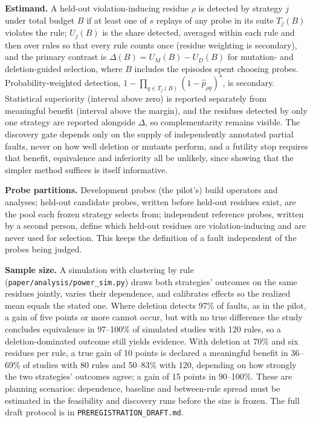 \documentclass[10pt]{article}
\theoremstyle{definition}
\begin{document}
\textbf{Estimand.} A held-out violation-inducing residue $\rho$ is detected by strategy $j$ under total budget $B$ if at least one of $s$ replays of any probe in its suite $T_j(B)$ violates the rule; $U_j(B)$ is the share detected, averaged within each rule and then over rules so that every rule counts once (residue weighting is secondary), and the primary contrast is $\Delta(B)=U_M(B)-U_D(B)$ for mutation- and deletion-guided selection, where $B$ includes the episodes spent choosing probes. Probability-weighted detection, $1-\prod_{q\in T_j(B)}(1-\hat p_{\rho q})^{s}$, is secondary. Statistical superiority (interval above zero) is reported separately from meaningful benefit (interval above the margin), and the residues detected by only one strategy are reported alongside $\Delta$, so complementarity remains visible. The discovery gate depends only on the supply of independently annotated partial faults, never on how well deletion or mutants perform, and a futility stop requires that benefit, equivalence and inferiority all be unlikely, since showing that the simpler method suffices is itself informative.

\textbf{Probe partitions.} Development probes (the pilot's) build operators and analyses; held-out candidate probes, written before held-out residues exist, are the pool each frozen strategy selects from; independent reference probes, written by a second person, define which held-out residues are violation-inducing and are never used for selection. This keeps the definition of a fault independent of the probes being judged.

\textbf{Sample size.} A simulation with clustering by rule (\texttt{paper/analysis/power\_sim.py}) draws both strategies' outcomes on the same residues jointly, varies their dependence, and calibrates effects so the realized mean equals the stated one. Where deletion detects 97\% of faults, as in the pilot, a gain of five points or more cannot occur, but with no true difference the study concludes equivalence in 97--100\% of simulated studies with 120 rules, so a deletion-dominated outcome still yields evidence. With deletion at 70\% and six residues per rule, a true gain of 10 points is declared a meaningful benefit in 36--69\% of studies with 80 rules and 50--83\% with 120, depending on how strongly the two strategies' outcomes agree; a gain of 15 points in 90--100\%. These are planning scenarios: dependence, baseline and between-rule spread must be estimated in the feasibility and discovery runs before the size is frozen. The full draft protocol is in \texttt{PREREGISTRATION\_DRAFT.md}.
\end{document}
